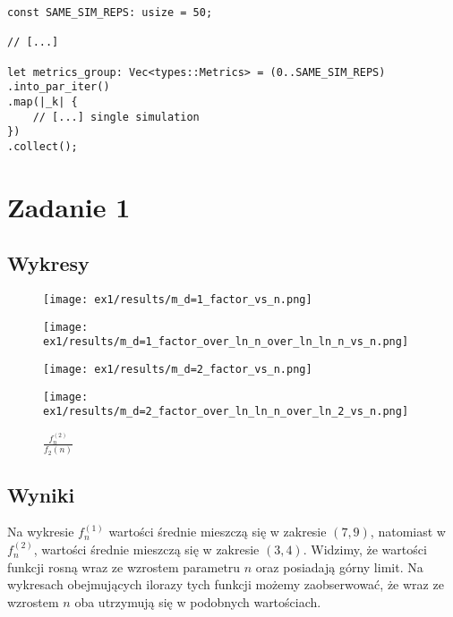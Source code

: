 \documentclass{article}
\begin{document}
\begin{verbatim}
const SAME_SIM_REPS: usize = 50;

// [...]

let metrics_group: Vec<types::Metrics> = (0..SAME_SIM_REPS)
.into_par_iter()
.map(|_k| {
    // [...] single simulation
})
.collect();
\end{verbatim}

\section{Zadanie 1}

\subsection{Wykresy}

\begin{figure}[H]
    \centering
        \begin{minipage}{0.24\textwidth}
        \centering
        \texttt{[image: ex1/results/m\_d=1\_factor\_vs\_n.png]}
        \caption{$f_n^{(1)}$}
    \end{minipage}
        \begin{minipage}{0.24\textwidth}
        \centering
        \texttt{[image: ex1/results/m\_d=1\_factor\_over\_ln\_n\_over\_ln\_ln\_n\_vs\_n.png]}
        \caption{$\frac{f_n^{(1)}}{f_1(n)}$}
    \end{minipage}
        \begin{minipage}{0.24\textwidth}
        \centering
        \texttt{[image: ex1/results/m\_d=2\_factor\_vs\_n.png]}
        \caption{$f_n^{(2)}$}
    \end{minipage}
    \begin{minipage}{0.24\textwidth}
        \centering
        \texttt{[image: ex1/results/m\_d=2\_factor\_over\_ln\_ln\_n\_over\_ln\_2\_vs\_n.png]}
        \caption{$\frac{f_n^{(2)}}{f_2(n)}$}
    \end{minipage}
\end{figure}

\subsection{Wyniki}

Na wykresie $f_n^{(1)}$ wartości średnie mieszczą się w zakresie $(7,9)$, natomiast w $f_n^{(2)}$, wartości średnie mieszczą się w zakresie $(3,4)$. Widzimy, że wartości funkcji rosną wraz ze wzrostem parametru $n$ oraz posiadają górny limit. Na wykresach obejmujących ilorazy tych funkcji możemy zaobserwować, że wraz ze wzrostem $n$ oba utrzymują się w podobnych wartościach.
\end{document}
